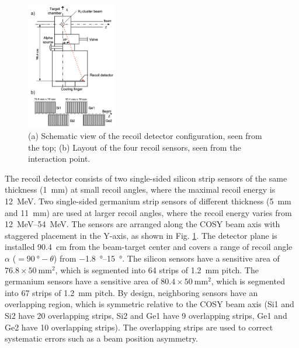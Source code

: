 \documentclass[number,5p]{elsarticle}
\begin{document}
\begin{figure}[htbp]
  \centering
  \includegraphics[width=0.35\textwidth]{./recoil_schematic.png}
  \caption{(a) Schematic view of the recoil detector configuration, seen from the
    top; (b) Layout of the four recoil sensors, seen from the interaction point.}
  \label{fig:recoil_schematic}
\end{figure}
The recoil detector consists of two single-sided silicon strip sensors of the same
thickness (\SI{1}{\mm}) at small recoil angles, where the maximal recoil energy
is \SI{12}{\MeV}. Two single-sided germanium strip sensors of different
thickness (\SI{5}{\mm} and \SI{11}{\mm}) are used at larger recoil angles, where
the recoil energy varies from \SIrange{12}{54}{\MeV}.
The sensors are arranged along the COSY beam axis with staggered placement in
the Y-axis, as shown in Fig. \ref{fig:recoil_schematic}.
The detector plane is installed \SI{90.4}{\cm} from the beam-target center
and covers a range of recoil angle $\alpha$ ($=\SI{90}{\degree}-\theta$) from \SIrange[range-units=repeat]{-1.8}{15}{\degree}.
The silicon sensors have a sensitive area of $76.8 \times \SI{50}{\mm\squared}$, which is
segmented into 64 strips of \SI{1.2}{\mm} pitch.
The germanium sensors have a sensitive area of \(80.4 \times \SI{50}{\mm\squared}\), which is segmented into 67 strips of \SI{1.2}{\mm} pitch.
By design, neighboring sensors have an overlapping region, which is symmetric
relative to the COSY beam axis (Si1 and Si2 have 20 overlapping strips, Si2 and Ge1
have 9 overlapping strips, Ge1 and Ge2 have 10 overlapping strips).
The overlapping strips are used to correct systematic errors such as a beam position asymmetry.
\end{document}
